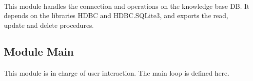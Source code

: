\documentclass[26pt,fleqn,]{article}
\begin{document}
\paragraph{}This module handles the connection and operations on the knowledge base DB. It depends on the libraries HDBC and HDBC.SQLite3, and exports the read, update and delete procedures.

\subsection{Module Main}

\paragraph{}This module is in charge of user interaction. The main loop is defined here.
\end{document}
